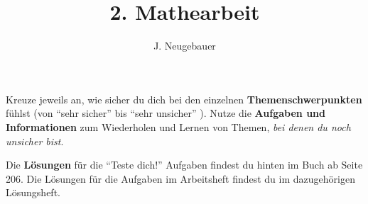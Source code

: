 \documentclass[11pt, a4paper]{scrartcl}
\author{J. Neugebauer}
\title{2. Mathearbeit}
\date{\Heute}
\begin{document}
\CheckupBild\CheckupTitel

Kreuze jeweils an, wie sicher du dich bei den einzelnen \textbf{Themenschwerpunkten} fühlst (von \enquote{sehr sicher}  bis \enquote{sehr unsicher} ). Nutze die \textbf{Aufgaben und Informationen} zum Wiederholen und Lernen von Themen, \emph{bei denen du noch unsicher bist}.

Die \textbf{Lösungen} für die \enquote{Teste dich!} Aufgaben findest du hinten im Buch ab Seite 206. Die Lösungen für die Aufgaben im Arbeitsheft findest du im dazugehörigen Lösungsheft.

\begin{checkup}
\end{checkup}
\end{document}

